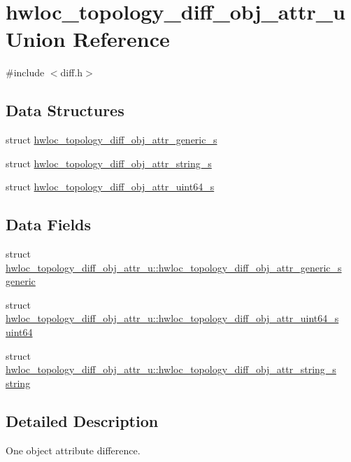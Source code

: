 \hypertarget{a00334}{}\section{hwloc\+\_\+topology\+\_\+diff\+\_\+obj\+\_\+attr\+\_\+u Union Reference}
\label{a00334}


{\ttfamily \#include $<$diff.\+h$>$}

\subsection*{Data Structures}
\begin{DoxyCompactItemize}
\item 
struct \hyperlink{a00338}{hwloc\+\_\+topology\+\_\+diff\+\_\+obj\+\_\+attr\+\_\+generic\+\_\+s}
\item 
struct \hyperlink{a00346}{hwloc\+\_\+topology\+\_\+diff\+\_\+obj\+\_\+attr\+\_\+string\+\_\+s}
\item 
struct \hyperlink{a00342}{hwloc\+\_\+topology\+\_\+diff\+\_\+obj\+\_\+attr\+\_\+uint64\+\_\+s}
\end{DoxyCompactItemize}
\subsection*{Data Fields}
\begin{DoxyCompactItemize}
\item 
struct \hyperlink{a00338}{hwloc\+\_\+topology\+\_\+diff\+\_\+obj\+\_\+attr\+\_\+u\+::hwloc\+\_\+topology\+\_\+diff\+\_\+obj\+\_\+attr\+\_\+generic\+\_\+s} \hyperlink{a00334_a68039c178e9961023345e0728382773b}{generic}
\item 
struct \hyperlink{a00342}{hwloc\+\_\+topology\+\_\+diff\+\_\+obj\+\_\+attr\+\_\+u\+::hwloc\+\_\+topology\+\_\+diff\+\_\+obj\+\_\+attr\+\_\+uint64\+\_\+s} \hyperlink{a00334_abb15bfa7039ca8c97cd7ddfbdf779efa}{uint64}
\item 
struct \hyperlink{a00346}{hwloc\+\_\+topology\+\_\+diff\+\_\+obj\+\_\+attr\+\_\+u\+::hwloc\+\_\+topology\+\_\+diff\+\_\+obj\+\_\+attr\+\_\+string\+\_\+s} \hyperlink{a00334_a518a48e13168c31957589ce78820163e}{string}
\end{DoxyCompactItemize}


\subsection{Detailed Description}
One object attribute difference. 

